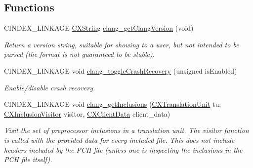 \subsection*{Functions}
\begin{DoxyCompactItemize}
\item 
\mbox{\label{group__CINDEX__MISC_ga307e960e9dccaf721c0032cd4edd8908}} 
C\+I\+N\+D\+E\+X\+\_\+\+L\+I\+N\+K\+A\+GE \mbox{\hyperlink{structCXString}{C\+X\+String}} \mbox{\hyperlink{group__CINDEX__MISC_ga307e960e9dccaf721c0032cd4edd8908}{clang\+\_\+get\+Clang\+Version}} (void)
\begin{DoxyCompactList}\small\item\em Return a version string, suitable for showing to a user, but not intended to be parsed (the format is not guaranteed to be stable). \end{DoxyCompactList}\item 
C\+I\+N\+D\+E\+X\+\_\+\+L\+I\+N\+K\+A\+GE void \mbox{\hyperlink{group__CINDEX__MISC_ga45afc52d275aa0587c69d4b6d2f10bf2}{clang\+\_\+toggle\+Crash\+Recovery}} (unsigned is\+Enabled)
\begin{DoxyCompactList}\small\item\em Enable/disable crash recovery. \end{DoxyCompactList}\item 
\mbox{\label{group__CINDEX__MISC_ga4363bd8c203ca2b5dfc23c5765695d60}} 
C\+I\+N\+D\+E\+X\+\_\+\+L\+I\+N\+K\+A\+GE void \mbox{\hyperlink{group__CINDEX__MISC_ga4363bd8c203ca2b5dfc23c5765695d60}{clang\+\_\+get\+Inclusions}} (\mbox{\hyperlink{group__CINDEX_gacdb7815736ca709ce9a5e1ec2b7e16ac}{C\+X\+Translation\+Unit}} tu, \mbox{\hyperlink{group__CINDEX__MISC_ga075c50e5cf912f15d902cff864ea7d13}{C\+X\+Inclusion\+Visitor}} visitor, \mbox{\hyperlink{group__CINDEX_gacfa40c3de26d228c0d898403c2c21612}{C\+X\+Client\+Data}} client\+\_\+data)
\begin{DoxyCompactList}\small\item\em Visit the set of preprocessor inclusions in a translation unit. The visitor function is called with the provided data for every included file. This does not include headers included by the P\+CH file (unless one is inspecting the inclusions in the P\+CH file itself). \end{DoxyCompactList}\item 
\mbox{\label{group__CINDEX__MISC_ga6be809ca82538f4a610d9a5b18a10ccb}} 

\end{DoxyCompactItemize}

